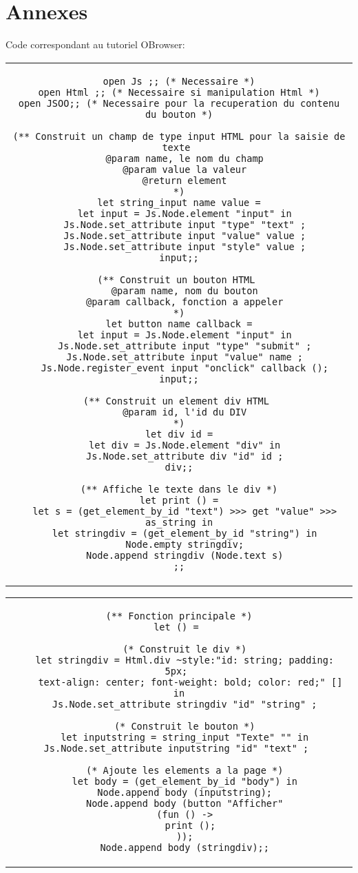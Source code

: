 \documentclass[a4paper,11pt,titlepage]{article}
\begin{document}
\section{Annexes}
  \label{tutoObrowser}
  Code correspondant au tutoriel OBrowser:
  \begin{center}
  \begin{tabular}{c}

 \begin{lstlisting}
open Js ;; (* Necessaire *)
open Html ;; (* Necessaire si manipulation Html *)
open JSOO;; (* Necessaire pour la recuperation du contenu du bouton *)

(** Construit un champ de type input HTML pour la saisie de texte 
  @param name, le nom du champ
  @param value la valeur
  @return element
*)
let string_input name value =
  let input = Js.Node.element "input" in
  Js.Node.set_attribute input "type" "text" ;
  Js.Node.set_attribute input "value" value ;
  Js.Node.set_attribute input "style" value ;
input;;

(** Construit un bouton HTML 
  @param name, nom du bouton
  @param callback, fonction a appeler
*)
let button name callback =
  let input = Js.Node.element "input" in
  Js.Node.set_attribute input "type" "submit" ;
  Js.Node.set_attribute input "value" name ;
  Js.Node.register_event input "onclick" callback ();
input;;

(** Construit un element div HTML 
  @param id, l'id du DIV
*)
let div id =
  let div = Js.Node.element "div" in
  Js.Node.set_attribute div "id" id ;
div;;

(** Affiche le texte dans le div *)
let print () =
  let s = (get_element_by_id "text") >>> get "value" >>> as_string in
  let stringdiv = (get_element_by_id "string") in
  Node.empty stringdiv;
  Node.append stringdiv (Node.text s)
;;
 \end{lstlisting}

\end{tabular}
\end{center}
\newpage

  \begin{center}
  \begin{tabular}{c}

 \begin{lstlisting}
(** Fonction principale *)
let () = 

  (* Construit le div *)
  let stringdiv = Html.div ~style:"id: string; padding: 5px; 
    text-align: center; font-weight: bold; color: red;" [] in
  Js.Node.set_attribute stringdiv "id" "string" ;

  (* Construit le bouton *)
  let inputstring = string_input "Texte" "" in
  Js.Node.set_attribute inputstring "id" "text" ;	
	
  (* Ajoute les elements a la page *)
  let body = (get_element_by_id "body") in
  Node.append body (inputstring);
  Node.append body (button "Afficher"
  (fun () ->
    print ();
  ));
  Node.append body (stringdiv);;
 \end{lstlisting}

\end{tabular}
\end{center}
\end{document}

